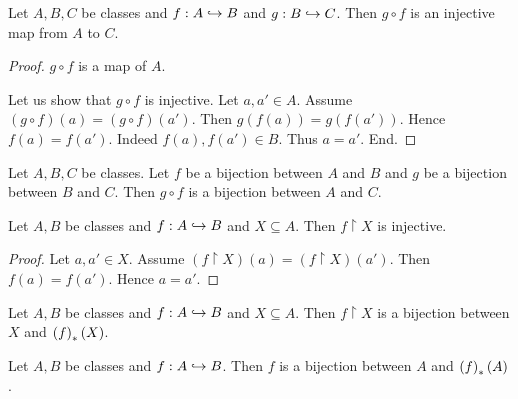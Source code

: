\documentclass[../../set-theory/set-theory.tex]{subfiles}
\begin{document}
  \begin{forthel}
    \begin{proposition}
      Let $A, B, C$ be classes and $f : A \hookrightarrow B$ and $g : B \hookrightarrow C$.
      Then $g \circ f$ is an injective map from $A$ to $C$.
    \end{proposition}
    \begin{proof}
      $g \circ f$ is a map of $A$.

      Let us show that $g \circ f$ is injective.
        Let $a, a' \in A$.
        Assume $(g \circ f)(a) = (g \circ f)(a')$.
        Then $g(f(a)) = g(f(a'))$.
        Hence $f(a) = f(a')$.
        Indeed $f(a), f(a') \in B$.
        Thus $a = a'$.
      End.
    \end{proof}
  \end{forthel}

  \begin{forthel}
    \begin{corollary}
      Let $A, B, C$ be classes.
      Let $f$ be a bijection between $A$ and $B$ and $g$ be a bijection between
      $B$ and $C$.
      Then $g \circ f$ is a bijection between $A$ and $C$.
    \end{corollary}
  \end{forthel}

  \begin{forthel}
    \begin{proposition}
      Let $A, B$ be classes and $f : A \hookrightarrow B$ and $X \subseteq A$.
      Then $f \restriction X$ is injective.
    \end{proposition}
    \begin{proof}
      Let $a, a' \in X$.
      Assume $(f \restriction X)(a) = (f \restriction X)(a')$.
      Then $f(a) = f(a')$.
      Hence $a = a'$.
    \end{proof}
  \end{forthel}

  \begin{forthel}
    \begin{proposition}
      Let $A, B$ be classes and $f : A \hookrightarrow B$ and $X \subseteq A$.
      Then $f \restriction X$ is a bijection between $X$ and $\left(f\right)_{*}(X)$.
    \end{proposition}
  \end{forthel}

  \begin{forthel}
    \begin{corollary}
      Let $A, B$ be classes and $f : A \hookrightarrow B$.
      Then $f$ is a bijection between $A$ and $\left(f\right)_{*}(A)$.
    \end{corollary}
  \end{forthel}
\end{document}
